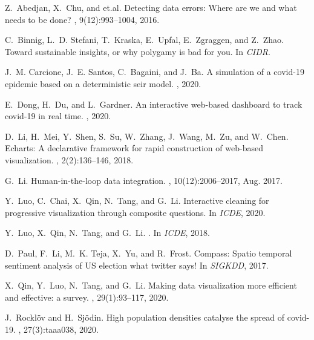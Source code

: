\documentclass[11pt]{article}
\begin{document}
\begin{thebibliography}{10}

Z.~Abedjan, X.~Chu, and et.al.
\newblock Detecting data errors: Where are we and what needs to be done?
, 9(12):993--1004, 2016.

C.~Binnig, L.~D. Stefani, T.~Kraska, E.~Upfal, E.~Zgraggen, and Z.~Zhao.
\newblock Toward sustainable insights, or why polygamy is bad for you.
\newblock In {\em {CIDR}}.

J.~M. Carcione, J.~E. Santos, C.~Bagaini, and J.~Ba.
\newblock A simulation of a covid-19 epidemic based on a deterministic seir
  model.
, 2020.

E.~Dong, H.~Du, and L.~Gardner.
\newblock An interactive web-based dashboard to track covid-19 in real time.
, 2020.

D.~Li, H.~Mei, Y.~Shen, S.~Su, W.~Zhang, J.~Wang, M.~Zu, and W.~Chen.
\newblock Echarts: {A} declarative framework for rapid construction of
  web-based visualization.
, 2(2):136--146, 2018.

G.~Li.
\newblock Human-in-the-loop data integration.
, 10(12):2006–2017, Aug. 2017.

Y.~Luo, C.~Chai, X.~Qin, N.~Tang, and G.~Li.
\newblock Interactive cleaning for progressive visualization through composite
  questions.
\newblock In {\em ICDE}, 2020.

Y.~Luo, X.~Qin, N.~Tang, and G.~Li.
.
\newblock In {\em ICDE}, 2018.

D.~Paul, F.~Li, M.~K. Teja, X.~Yu, and R.~Frost.
\newblock Compass: Spatio temporal sentiment analysis of {US} election what
  twitter says!
\newblock In {\em SIGKDD}, 2017.

X.~Qin, Y.~Luo, N.~Tang, and G.~Li.
\newblock Making data visualization more efficient and effective: a survey.
, 29(1):93--117, 2020.

J.~Rockl{\"o}v and H.~Sj{\"o}din.
\newblock High population densities catalyse the spread of covid-19.
, 27(3):taaa038, 2020.

\end{thebibliography}
\end{document}
